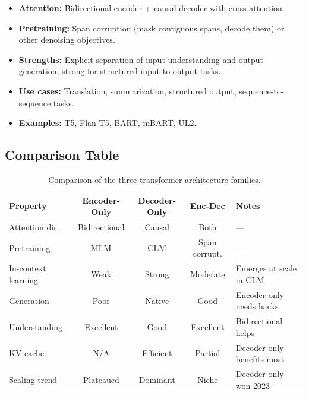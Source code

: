\begin{itemize}
    \item \textbf{Attention:} Bidirectional encoder + causal decoder with
          cross-attention.
    \item \textbf{Pretraining:} Span corruption (mask contiguous spans, decode
          them) or other denoising objectives.
    \item \textbf{Strengths:} Explicit separation of input understanding and
          output generation; strong for structured input-to-output tasks.
    \item \textbf{Use cases:} Translation, summarization, structured output,
          sequence-to-sequence tasks.
    \item \textbf{Examples:} T5, Flan-T5, BART, mBART, UL2.
\end{itemize}

\subsection{Comparison Table}

\begin{table}[H]
\centering
\small
\begin{tabularx}{\textwidth}{@{}l c c c X@{}}
\toprule
\textbf{Property} & \textbf{Encoder-Only} & \textbf{Decoder-Only} & \textbf{Enc-Dec} & \textbf{Notes} \\
\midrule
Attention dir.      & Bidirectional & Causal      & Both          & --- \\
Pretraining         & MLM           & CLM         & Span corrupt. & --- \\
In-context learning & Weak          & Strong      & Moderate      & Emerges at scale in CLM \\
Generation          & Poor          & Native      & Good          & Encoder-only needs hacks \\
Understanding       & Excellent     & Good        & Excellent     & Bidirectional helps \\
KV-cache            & N/A           & Efficient   & Partial       & Decoder-only benefits most \\
Scaling trend       & Plateaued     & Dominant    & Niche         & Decoder-only won 2023+ \\
\bottomrule
\end{tabularx}
\caption{Comparison of the three transformer architecture families.}
\label{tab:arch-comparison}
\end{table}


